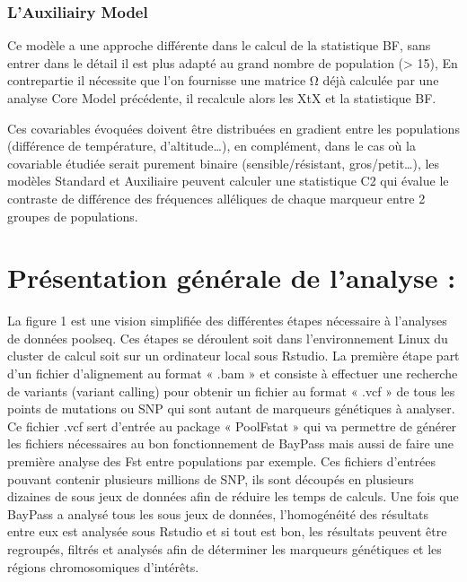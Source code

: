 \documentclass[
  openany]{book}
\begin{document}
\hypertarget{lauxiliairy-model}{%
\subsubsection*{L'Auxiliairy Model}\label{lauxiliairy-model}}

Ce modèle a une approche différente dans le calcul de la statistique BF, sans entrer dans le détail il est plus adapté au grand nombre de population (\textgreater{} 15), En contrepartie il nécessite que l'on fournisse une matrice Ω déjà calculée par une analyse Core Model précédente, il recalcule alors les XtX et la statistique BF.

Ces covariables évoquées doivent être distribuées en gradient entre les populations (différence de température, d'altitude\ldots), en complément, dans le cas où la covariable étudiée serait purement binaire (sensible/résistant, gros/petit\ldots), les modèles Standard et Auxiliaire peuvent calculer une statistique C2 qui évalue le contraste de différence des fréquences alléliques de chaque marqueur entre 2 groupes de populations.

\hypertarget{pruxe9sentation-guxe9nuxe9rale-de-lanalyse}{%
\section*{Présentation générale de l'analyse :}\label{pruxe9sentation-guxe9nuxe9rale-de-lanalyse}}

La figure 1 est une vision simplifiée des différentes étapes nécessaire à l'analyses de données poolseq. Ces étapes se déroulent soit dans l'environnement Linux du cluster de calcul soit sur un ordinateur local sous Rstudio.
La première étape part d'un fichier d'alignement au format « .bam » et consiste à effectuer une recherche de variants (variant calling) pour obtenir un fichier au format « .vcf » de tous les points de mutations ou SNP qui sont autant de marqueurs génétiques à analyser. Ce fichier .vcf sert d'entrée au package « PoolFstat » qui va permettre de générer les fichiers nécessaires au bon fonctionnement de BayPass mais aussi de faire une première analyse des Fst entre populations par exemple. Ces fichiers d'entrées pouvant contenir plusieurs millions de SNP, ils sont découpés en plusieurs dizaines de sous jeux de données afin de réduire les temps de calculs. Une fois que BayPass a analysé tous les sous jeux de données, l'homogénéité des résultats entre eux est analysée sous Rstudio et si tout est bon, les résultats peuvent être regroupés, filtrés et analysés afin de déterminer les marqueurs génétiques et les régions chromosomiques d'intérêts.
\end{document}
